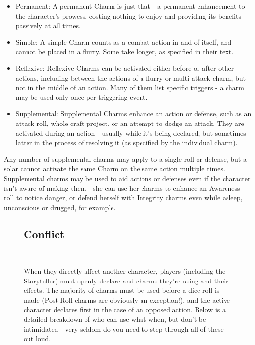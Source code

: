 \documentclass[oneside]{book}
\newlength{\sidewidth}
\newenvironment{sidebarPartial}[2][]{%
   \def\imgcmd{\texttt{[image: \#2]}}%
   \begin{lrbox}{\mysavebox}%
   \begin{minipage}%
}{%
   \end{minipage}
   \end{lrbox}%
   \sbox\mysavebox{\fbox{\usebox\mysavebox}}%
   \mbox{\rlap{\raisebox{-\dp\mysavebox}{\imgcmd}}\usebox\mysavebox}%
}
\newenvironment{sidebar}[1]{%
  \begin{figure}[tb]%
  \begin{sidebarPartial}{resources/bg-sidebar.jpg}{\textwidth}%
  \vspace{6pt}
  \subsection*{#1}\vspace{6pt}%
  \centering
  \begin{minipage}{\sidewidth}
}
{
  \end{minipage}
  \vspace{6pt}
  \end{sidebarPartial}
  \end{figure}
}
\begin{document}
\begin{multicols}{2}
\begin{itemize}
\item Permanent: A permanent Charm is just that - a permanent enhancement to the character's prowess, costing nothing to enjoy and providing its benefits passively at all times.
\item Simple: A simple Charm counts as a combat action in and of itself, and cannot be placed in a flurry. Some take longer, as specified in their text.
\item Reflexive: Reflexive Charms can be activated either before or after other actions, including between the actions of a flurry or multi-attack charm, but not in the middle of an action. Many of them list specific triggers - a charm may be used only once per triggering event.
\item Supplemental: Supplemental Charms enhance an action or defense, such as an attack roll, whole craft project, or an attempt to dodge an attack. They are activated during an action - usually while it's being declared, but sometimes latter in the process of resolving it (as specified by the individual charm).
\end{itemize}

\par Any number of supplemental charms may apply to a single roll or defense, but a solar cannot activate the same Charm on the same action multiple times. Supplemental charms may be used to aid actions or defenses even if the character isn't aware of making them - she can use her charms to enhance an Awareness roll to notice danger, or defend herself with Integrity charms even while asleep, unconscious or drugged, for example.

\begin{sidebar}{Conflict}\
  \par When they directly affect another character, players (including the Storyteller) must openly declare and charms they're using and their effects. The majority of charms must be used before a dice roll is made (Post-Roll charms are obviously an exception!), and the active character declares first in the case of an opposed action. Below is a detailed breakdown of who can use what when, but don't be intimidated - very seldom do you need to step through all of these out loud.


\end{sidebar}
\end{multicols}
\end{document}
